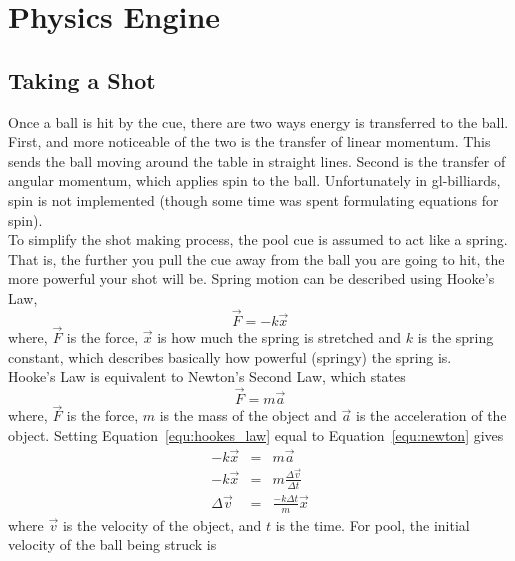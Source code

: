 \newcommand{\pvec}[1]{\vec{#1}\mkern2mu\vphantom{#1}}

\section{Physics Engine}

    \subsection{Taking a Shot}
    Once a ball is hit by the cue, there are two ways energy is transferred to the ball. First, and more noticeable of the two
    is the transfer of linear momentum. This sends the ball moving around the table in straight lines. Second is the transfer
    of angular momentum, which applies spin to the ball. Unfortunately in gl-billiards, spin is not implemented (though some
    time was spent formulating equations for spin). \\
    To simplify the shot making process, the pool cue is assumed to act like a spring. That is, the further you pull
    the cue away from the ball you are going to hit, the more powerful your shot will be. Spring motion can be described
    using Hooke's Law,
    \begin{equation}
        \vec F = -k \vec x
        \label{equ:hookes_law}
    \end{equation}
    where, $\vec F$ is the force, $\vec x$ is how much the spring is stretched and $k$ is the spring constant, which
    describes basically how powerful (springy) the spring is.
    \\
    Hooke's Law is equivalent to Newton's Second Law, which states
    \begin{equation}
        \vec F = m \vec a
        \label{equ:newton}
    \end{equation}
    where, $\vec F$ is the force, $m$ is the mass of the object and $\vec a$ is the acceleration of the object. Setting
    Equation~\ref{equ:hookes_law} equal to Equation~\ref{equ:newton} gives
    \begin{eqnarray}
        -k \vec x &=& m \vec a \nonumber \\
        -k \vec x &=& m \frac{\Delta \vec v}{\Delta t} \nonumber \\
        \Delta \vec v &=& \frac{-k \Delta t}{m}\vec x  \nonumber
    \end{eqnarray}
    where $\vec v$ is the velocity of the object, and $t$ is the time. For pool, the initial velocity of the ball being struck is
